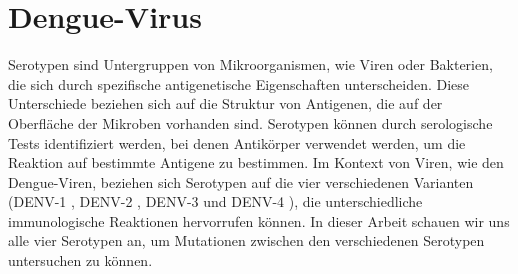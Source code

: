 \documentclass[german,version-2022-01]{uzl-thesis}
\begin{document}
\section{Dengue-Virus}
Serotypen sind Untergruppen von Mikroorganismen, wie Viren oder Bakterien, die sich durch spezifische antigenetische Eigenschaften unterscheiden. Diese Unterschiede beziehen sich auf die Struktur von Antigenen, die auf der Oberfl\"ache der Mikroben vorhanden sind. Serotypen k\"onnen durch serologische Tests identifiziert werden, bei denen Antik\"orper verwendet werden, um die Reaktion auf bestimmte Antigene zu bestimmen. Im Kontext von Viren, wie den Dengue-Viren, beziehen sich Serotypen auf die vier verschiedenen Varianten (DENV-1 \cite{tittarelli_dengue_2014}, DENV-2 \cite{cao_retrospective_2023}, DENV-3 \cite{peyrefitte_genetic_2003} und DENV-4 \cite{wardhani_genetic_2023}), die unterschiedliche immunologische Reaktionen hervorrufen k\"onnen. In dieser Arbeit schauen wir uns alle vier Serotypen an, um Mutationen zwischen den verschiedenen Serotypen untersuchen zu k\"onnen. 
\end{document}
